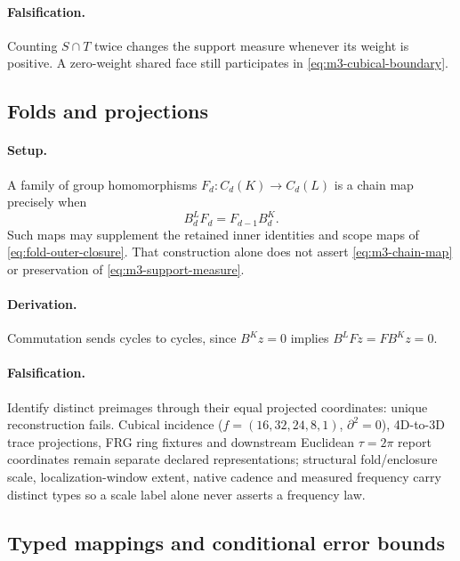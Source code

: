 \paragraph{Falsification.}
Counting \(S\cap T\) twice changes the support
measure whenever its weight is positive. A zero-weight shared face still
participates in \eqref{eq:m3-cubical-boundary}.

\subsection{Folds and projections}
\label{prop:m3-fold-support}
\paragraph{Setup.}
A family of group homomorphisms \(F_d:C_d(K)\to C_d(L)\) is a chain map precisely when
\begin{equation}
 B_d^L F_d=F_{d-1}B_d^K.
 \label{eq:m3-chain-map}
\end{equation}
Such maps may supplement the retained inner identities and scope maps of
\eqref{eq:fold-outer-closure}. That construction alone does not assert
\eqref{eq:m3-chain-map} or preservation of \eqref{eq:m3-support-measure}.

\paragraph{Derivation.}
Commutation sends cycles to cycles, since \(B^Kz=0\) implies
\(B^LFz=FB^Kz=0\).

\paragraph{Falsification.}
Identify distinct preimages through their equal projected coordinates:
unique reconstruction fails. Cubical incidence (\(f=(16,32,24,8,1)\),
\(\partial^2=0\)), 4D-to-3D trace projections, FRG ring fixtures and downstream
Euclidean \(\tau=2\pi\) report coordinates remain separate declared
representations; structural fold/enclosure scale, localization-window extent,
native cadence and measured frequency carry distinct types so a scale label
alone never asserts a frequency law.

\subsection{Typed mappings and conditional error bounds}
\label{sec:m3-maps}
\label{def:m3-map}
